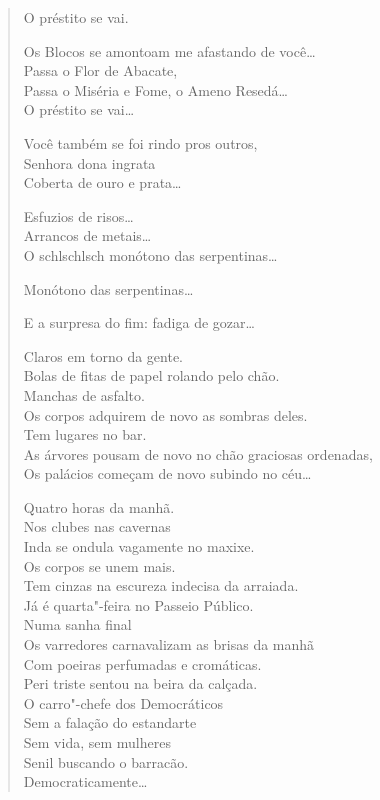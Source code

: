 \begin{verse}
O préstito se vai.

Os Blocos se amontoam me afastando de você\ldots{}\\
Passa o Flor de Abacate,\\
Passa o Miséria e Fome, o Ameno Resedá\ldots{}\\
O préstito se vai\ldots{}

Você também se foi rindo pros outros,\\
Senhora dona ingrata\\
Coberta de ouro e prata\ldots{}

Esfuzios de risos\ldots{}\\
\quad\quad\quad{}Arrancos de metais\ldots{}\\
O schlschlsch monótono das serpentinas\ldots{}

Monótono das serpentinas\ldots{}

E a surpresa do fim: fadiga de gozar\ldots{}

Claros em torno da gente.\\
Bolas de fitas de papel rolando pelo chão.\\
Manchas de asfalto.\\
Os corpos adquirem de novo as sombras deles.\\
Tem lugares no bar.\\
As árvores pousam de novo no chão graciosas ordenadas,\\
Os palácios começam de novo subindo no céu\ldots{}

Quatro horas da manhã.\\
Nos clubes nas cavernas\\
Inda se ondula vagamente no maxixe.\\
Os corpos se unem mais.\\
Tem cinzas na escureza indecisa da arraiada.\\
Já é quarta"-feira no Passeio Público.\\
Numa sanha final\\
Os varredores carnavalizam as brisas da manhã\\
Com poeiras perfumadas e cromáticas.\\
Peri triste sentou na beira da calçada.\\
O carro"-chefe dos Democráticos\\
Sem a falação do estandarte\\
Sem vida, sem mulheres\\
Senil buscando o barracão.\\
Democraticamente\ldots{}


\end{verse}
